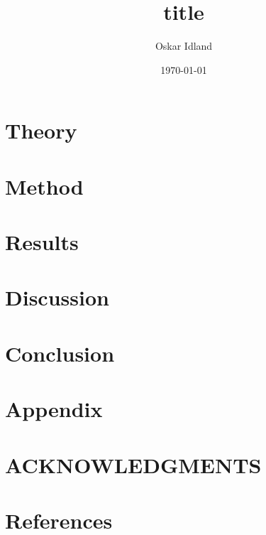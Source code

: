 \documentclass[reprint,english,notitlepage]{revtex4-2}
\begin{document}
\title{title}
\author{Oskar Idland}
\date{\today}

\begin{abstract}
\end{abstract}
\maketitle

\section{Theory} \label{sec: theory}


\section{Method} \label{sec: method}


\section{Results} \label{sec: results}


\section{Discussion} \label{sec: discussion}


\section{Conclusion} \label{sec: conclusion}


\section{Appendix} \label{sec: appendix}

\section*{ACKNOWLEDGMENTS}

\section*{References} \label{sec: references}
\end{document}
